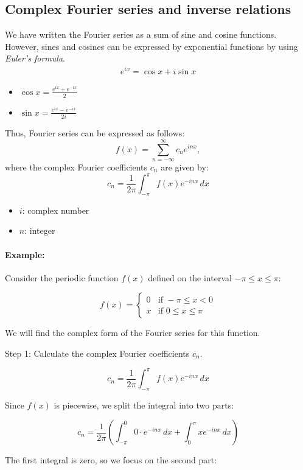 \subsection{Complex Fourier series and inverse relations}

We have written the Fourier series as a sum of sine and cosine functions. However, sines and cosines can be expressed by exponential functions by using \textit{Euler's formula}. 
\begin{align}
	e^{ix}=\cos x+i\sin x
	\label{eq:euler_formula}
\end{align}
\begin{itemize}
	\item $\cos x=\frac{e^{ix}+e^{-ix}}{2}$
	\item $\sin x=\frac{e^{ix}-e^{-ix}}{2i}$
\end{itemize}
Thus, Fourier series can be expressed as follows:
$$f(x) = \sum_{n=-\infty}^{\infty} c_n e^{inx},$$
where the complex Fourier coefficients \( c_n \) are given by:
\[ c_n = \frac{1}{2\pi} \int_{-\pi}^{\pi} f(x) e^{-inx} \, dx \]

\begin{itemize}
	\item $i$: complex number
	\item $n$: integer
\end{itemize}

\paragraph{Example: }Consider the periodic function \( f(x) \) defined on the interval \( -\pi \leq x \leq \pi \):

\[ f(x) = \begin{cases} 
0 & \text{if } -\pi \leq x < 0 \\
x & \text{if } 0 \leq x \leq \pi 
\end{cases} \]

We will find the complex form of the Fourier series for this function.

Step 1: Calculate the complex Fourier coefficients \( c_n \).

\[ c_n = \frac{1}{2\pi} \int_{-\pi}^{\pi} f(x) e^{-inx} \, dx \]

Since \( f(x) \) is piecewise, we split the integral into two parts:

\[ c_n = \frac{1}{2\pi} \left( \int_{-\pi}^{0} 0 \cdot e^{-inx} \, dx + \int_{0}^{\pi} x e^{-inx} \, dx \right) \]

The first integral is zero, so we focus on the second part:

